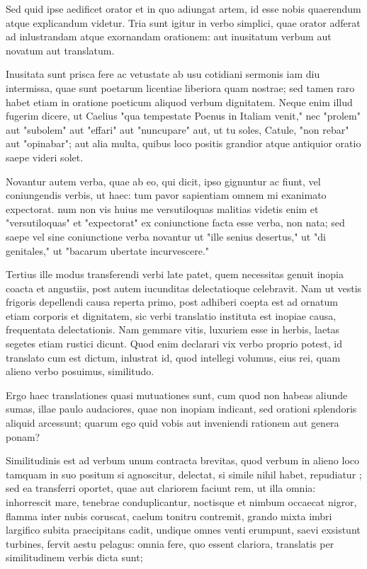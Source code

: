  Sed quid ipse aedificet orator et in quo adiungat artem, id esse nobis quaerendum atque explicandum videtur. Tria sunt igitur in verbo simplici, quae orator adferat ad inlustrandam atque exornandam orationem: aut inusitatum verbum aut novatum aut translatum.

 Inusitata sunt prisca fere ac vetustate ab usu cotidiani sermonis iam diu intermissa, quae sunt poetarum licentiae liberiora quam nostrae; sed tamen raro habet etiam in oratione poeticum aliquod verbum dignitatem. Neque enim illud fugerim dicere, ut Caelius "qua tempestate Poenus in Italiam venit," nec "prolem" aut "subolem" aut "effari" aut "nuncupare" aut, ut tu soles, Catule, "non rebar" aut "opinabar"; aut alia multa, quibus loco positis grandior atque antiquior oratio saepe videri solet.

 Novantur autem verba, quae ab eo, qui dicit, ipso gignuntur ac fiunt, vel coniungendis verbis, ut haec: tum pavor sapientiam omnem mi exanimato expectorat. num non vis huius me versutiloquas malitias videtis enim et "versutiloquas" et "expectorat" ex coniunctione facta esse verba, non nata; sed saepe vel sine coniunctione verba novantur ut "ille senius desertus," ut "di genitales," ut "bacarum ubertate incurvescere."

 Tertius ille modus transferendi verbi late patet, quem necessitas genuit inopia coacta et angustiis, post autem iucunditas delectatioque celebravit. Nam ut vestis frigoris depellendi causa reperta primo, post adhiberi coepta est ad ornatum etiam corporis et dignitatem, sic verbi translatio instituta est inopiae causa, frequentata delectationis. Nam gemmare vitis, luxuriem esse in herbis, laetas segetes etiam rustici dicunt. Quod enim declarari vix verbo proprio potest, id translato cum est dictum, inlustrat id, quod intellegi volumus, eius rei, quam alieno verbo posuimus, similitudo.

 Ergo haec translationes quasi mutuationes sunt, cum quod non habeas aliunde sumas, illae paulo audaciores, quae non inopiam indicant, sed orationi splendoris aliquid arcessunt; quarum ego quid vobis aut inveniendi rationem aut genera ponam?

 Similitudinis est ad verbum unum contracta brevitas, quod verbum in alieno loco tamquam in suo positum si agnoscitur, delectat, si simile nihil habet, repudiatur ; sed ea transferri oportet, quae aut clariorem faciunt rem, ut illa omnia: inhorrescit mare, tenebrae conduplicantur, noctisque et nimbum occaecat nigror, flamma inter nubis coruscat, caelum tonitru contremit, grando mixta imbri largifico subita praecipitans cadit, undique omnes venti erumpunt, saevi exsistunt turbines, fervit aestu pelagus: omnia fere, quo essent clariora, translatis per similitudinem verbis dicta sunt;

